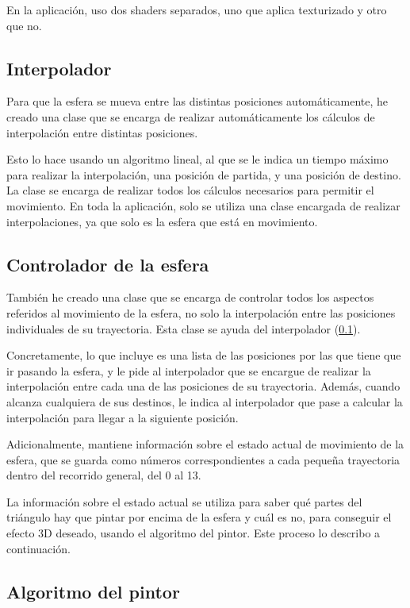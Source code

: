 \documentclass[a4paper,12pt]{article}
\begin{document}
En la aplicación, uso dos shaders separados, uno que aplica texturizado y otro que no.

\subsection{Interpolador} \label{interpolador}

Para que la esfera se mueva entre las distintas posiciones automáticamente, he creado una clase que se encarga de realizar automáticamente los cálculos de interpolación entre distintas posiciones.

Esto lo hace usando un algoritmo lineal, al que se le indica un tiempo máximo para realizar la interpolación, una posición de partida, y una posición de destino. La clase se encarga de realizar todos los cálculos necesarios para permitir el movimiento. En toda la aplicación, solo se utiliza una clase encargada de realizar interpolaciones, ya que solo es la esfera que está en movimiento.

\subsection{Controlador de la esfera} \label{controlador_esfera}

También he creado una clase que se encarga de controlar todos los aspectos referidos al movimiento de la esfera, no solo la interpolación entre las posiciones individuales de su trayectoria. Esta clase se ayuda del interpolador (\ref{interpolador}).

Concretamente, lo que incluye es una lista de las posiciones por las que tiene que ir pasando la esfera, y le pide al interpolador que se encargue de realizar la interpolación entre cada una de las posiciones de su trayectoria. Además, cuando alcanza cualquiera de sus destinos, le indica al interpolador que pase a calcular la interpolación para llegar a la siguiente posición.

Adicionalmente, mantiene información sobre el estado actual de movimiento de la esfera, que se guarda como números correspondientes a cada pequeña trayectoria dentro del recorrido general, del 0 al 13.

La información sobre el estado actual se utiliza para saber qué partes del triángulo hay que pintar por encima de la esfera y cuál es no, para conseguir el efecto 3D deseado, usando el algoritmo del pintor. Este proceso lo describo a continuación.

\subsection{Algoritmo del pintor} \label{algoritmo_pintor}
\end{document}

